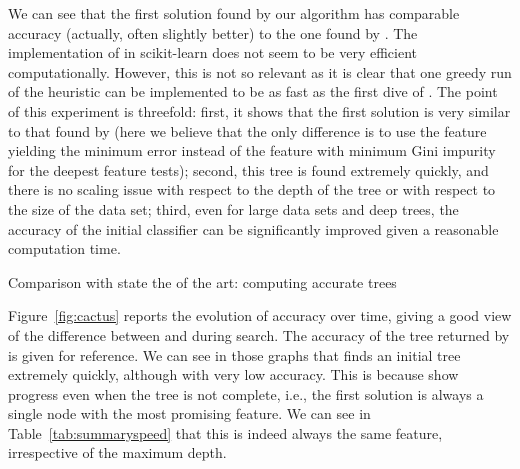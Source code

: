 \documentclass{llncs}
\begin{document}
We can see that the first solution found by our algorithm has comparable accuracy (actually, often slightly better) to the one found by \cart. The implementation of \cart in scikit-learn does not seem to be very efficient computationally. However, this is not so relevant as it is clear that one greedy run of the heuristic can be implemented to be as fast as the first dive of \budalg. The point of this experiment is threefold: first, it shows that the first solution is very similar to that found by \cart (here we believe that the only difference is to use the feature yielding the minimum error instead of the feature with minimum Gini impurity for the deepest feature tests); second, this tree
is found extremely quickly, and there is no scaling issue with respect to the depth of the tree or with respect to the size of the data set; third, even for large data sets and deep trees, the accuracy of the initial classifier can be significantly improved given a reasonable computation time.




\begin{table}[htbp]
\begin{center}
\begin{footnotesize}
\tabcolsep=1.8pt

\end{footnotesize}
\end{center}
\caption{\label{tab:summaryspeed} Comparison with state the of the art: computing accurate trees}
\end{table}


Figure~\ref{fig:cactus} reports the evolution of accuracy over time, giving a good view of the difference between \murtree and \budalg during search. The accuracy of the tree returned by \cart is given for reference. 
We can see in those graphs that \murtree finds an initial tree extremely quickly, although with very low accuracy. This is because \murtree show progress even when the tree is not complete, i.e., the first solution is always a single node with the most promising feature. We can see in Table~\ref{tab:summaryspeed} that this is indeed always the same feature, irrespective of the maximum depth.
\end{document}
